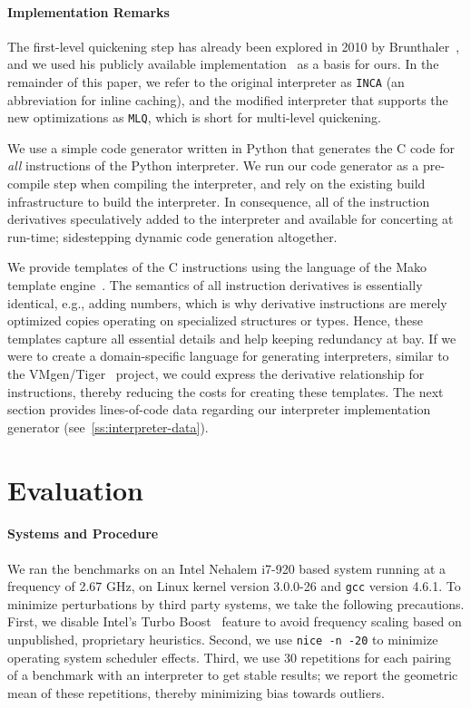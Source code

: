 \documentclass[preprint,10pt]{popl14conf}
\newcommand{\inca}{\texttt{INCA}}
\newcommand{\mlq}{\texttt{MLQ}}
\begin{document}
\paragraph{Implementation Remarks}
The first-level quickening step has already been explored in 2010 by
Brunthaler~\cite{brunthaler+10a,brunthaler+10b}, and we used his publicly available
implementation~\cite{brunthaler+12} as a basis for ours.
In the remainder of this paper, we refer to the original interpreter as \inca{} (an abbreviation for
inline caching), and the modified interpreter that supports the new optimizations as \mlq{}, which
is short for multi-level quickening.

We use a simple code generator written in Python that generates the C code for \emph{all}
instructions of the Python interpreter.
We run our code generator as a pre-compile step when compiling the interpreter, and rely on the
existing build infrastructure to build the interpreter.
In consequence, all of the instruction derivatives speculatively added to the interpreter and
available for concerting at run-time; sidestepping dynamic code generation altogether.

We provide templates of the C instructions using the language of the Mako template
engine~\cite{bayer+13}.
The semantics of all instruction derivatives is essentially identical, e.g., adding numbers, which
is why derivative instructions are merely optimized copies operating on specialized structures or
types.
Hence, these templates capture all essential details and help keeping redundancy at bay.
If we were to create a domain-specific language for generating interpreters, similar to the
VMgen/Tiger~\cite{ertl.etal+02,casey.etal+05a} project, we could express the derivative relationship
for instructions, thereby reducing the costs for creating these templates.
The next section provides lines-of-code data regarding our interpreter implementation generator
(see~\autoref{ss:interpreter-data}).


\section{Evaluation}\label{s:evaluation}

\paragraph{Systems and Procedure}
We ran the benchmarks on an Intel Nehalem i7-920 based system running at a frequency of 2.67 GHz, on
Linux kernel version 3.0.0-26 and \texttt{gcc} version 4.6.1.
To minimize perturbations by third party systems, we take the following precautions.
First, we disable Intel's Turbo Boost~\cite{intel+13a} feature to avoid frequency scaling based on
unpublished, proprietary heuristics.
Second, we use \texttt{nice -n -20} to minimize operating system scheduler effects.
Third, we use 30 repetitions for each pairing of a benchmark with an interpreter to get stable
results; we report the geometric mean of these repetitions, thereby minimizing bias towards
outliers.
\end{document}
